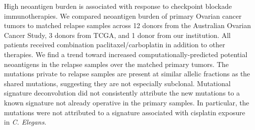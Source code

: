 High neoantigen burden is associated with response to checkpoint blockade immunotherapies. We compared neoantigen burden of primary Ovarian cancer tumors to matched relapse samples across 12 donors from the Australian Ovarian Cancer Study, 3 donors from TCGA, and 1 donor from our institution. All patients received combination paclitaxel/carboplatin in addition to other therapies. We find a trend toward increased computationally-predicted potential neoantigens in the relapse samples over the matched primary tumors. The mutations private to relapse samples are present at similar allelic fractions as the shared mutations, suggesting they are not especially subclonal. Mutational signature deconvolution did not consistently attribute the new mutations to a known signature not already operative in the primary samples. In particular, the mutations were not attributed to a signature associated with cisplatin exposure in \textit{C. Elegans}.

